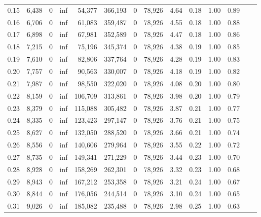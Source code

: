 \begin{tabular}{rrrrrrrrrrrrrr}
0.15 &  6,438 &      0 &      inf &   54,377 &  366,193 &       0 &  78,926 &  4.64 &  0.18 &  1.00 &      0.89 \\
0.16 &  6,706 &      0 &      inf &   61,083 &  359,487 &       0 &  78,926 &  4.55 &  0.18 &  1.00 &      0.88 \\
0.17 &  6,898 &      0 &      inf &   67,981 &  352,589 &       0 &  78,926 &  4.47 &  0.18 &  1.00 &      0.86 \\
0.18 &  7,215 &      0 &      inf &   75,196 &  345,374 &       0 &  78,926 &  4.38 &  0.19 &  1.00 &      0.85 \\
0.19 &  7,610 &      0 &      inf &   82,806 &  337,764 &       0 &  78,926 &  4.28 &  0.19 &  1.00 &      0.83 \\
0.20 &  7,757 &      0 &      inf &   90,563 &  330,007 &       0 &  78,926 &  4.18 &  0.19 &  1.00 &      0.82 \\
0.21 &  7,987 &      0 &      inf &   98,550 &  322,020 &       0 &  78,926 &  4.08 &  0.20 &  1.00 &      0.80 \\
0.22 &  8,159 &      0 &      inf &  106,709 &  313,861 &       0 &  78,926 &  3.98 &  0.20 &  1.00 &      0.79 \\
0.23 &  8,379 &      0 &      inf &  115,088 &  305,482 &       0 &  78,926 &  3.87 &  0.21 &  1.00 &      0.77 \\
0.24 &  8,335 &      0 &      inf &  123,423 &  297,147 &       0 &  78,926 &  3.76 &  0.21 &  1.00 &      0.75 \\
0.25 &  8,627 &      0 &      inf &  132,050 &  288,520 &       0 &  78,926 &  3.66 &  0.21 &  1.00 &      0.74 \\
0.26 &  8,556 &      0 &      inf &  140,606 &  279,964 &       0 &  78,926 &  3.55 &  0.22 &  1.00 &      0.72 \\
0.27 &  8,735 &      0 &      inf &  149,341 &  271,229 &       0 &  78,926 &  3.44 &  0.23 &  1.00 &      0.70 \\
0.28 &  8,928 &      0 &      inf &  158,269 &  262,301 &       0 &  78,926 &  3.32 &  0.23 &  1.00 &      0.68 \\
0.29 &  8,943 &      0 &      inf &  167,212 &  253,358 &       0 &  78,926 &  3.21 &  0.24 &  1.00 &      0.67 \\
0.30 &  8,844 &      0 &      inf &  176,056 &  244,514 &       0 &  78,926 &  3.10 &  0.24 &  1.00 &      0.65 \\
0.31 &  9,026 &      0 &      inf &  185,082 &  235,488 &       0 &  78,926 &  2.98 &  0.25 &  1.00 &      0.63 \\

\end{tabular}

